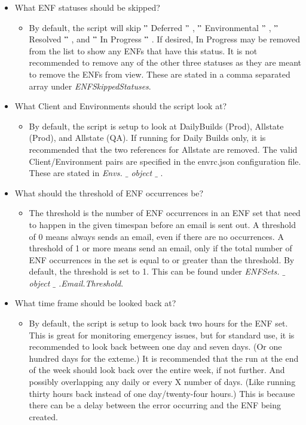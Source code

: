 \documentclass[a4paper,12pt]{report}
\begin{document}
\begin{itemize}
\item What ENF statuses should be skipped? \par
\begin{itemize}
\item By default, the script will skip  $ " $ Deferred $ " $ ,  $ " $ Environmental $ " $ ,  $ " $ Resolved $ " $ , and  $ " $ In Progress $ " $ . If desired, In Progress may be removed from the list to show any ENFs that have this status. It is not recommended to remove any of the other three statuses as they are meant to remove the ENFs from view. These are stated in a comma separated array under \textit{ENFSkippedStatuses}. \par
\end{itemize}
\item What Client and Environments should the script look at? \par
\begin{itemize}
\item By default, the script is setup to look at DailyBuilds (Prod), Allstate (Prod), and Allstate (QA). If running for Daily Builds only, it is recommended that the two references for Allstate are removed. The valid Client/Environment pairs are specified in the envrc.json configuration file. These are stated in \textit{Envs}\textit{. $  \_  $ object $  \_  $ }. \par
\end{itemize}
\item What should the threshold of ENF occurrences be?  \par
\begin{itemize}
\item The threshold is the number of ENF occurrences in an ENF set that need to happen in the given timespan before an email is sent out. A threshold of 0 means always sends an email, even if there are no occurrences. A threshold of 1 or more means send an email, only if the total number of ENF occurrences in the set is equal to or greater than the threshold. By default, the threshold is set to 1. This can be found under \textit{ENFSets}\textit{. $  \_  $ object $  \_  $ .}\textit{Email.Threshold}. \par
\end{itemize}
\item What time frame should be looked back at? \par
\begin{itemize}
\item By default, the script is setup to look back two hours for the ENF set. This is great for monitoring emergency issues, but for standard use, it is recommended to look back between one day and seven days. (Or one hundred days for the exteme.) It is recommended that the run at the end of the week should look back over the entire week, if not further. And possibly overlapping any daily or every X number of days. (Like running thirty hours back instead of one day/twenty-four hours.) This is because there can be a delay between the error occurring and the ENF being created.  \par
\end{itemize}
\end{itemize}
\end{document}
